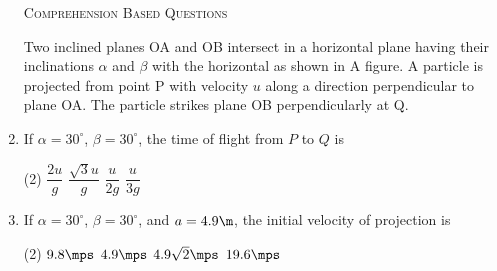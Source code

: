 \documentclass{article}
\renewcommand{\ans}{\quad}
\begin{document}
\begin{enumerate}
    \begin{center}
        \textsc{Comprehension Based Questions}
    \end{center}
    Two inclined planes OA and OB intersect in a horizontal plane having their inclinations $\alpha$ and $\beta$ with the horizontal as shown in A figure. A particle is projected from point P with velocity $u$ along a direction perpendicular to plane OA. The particle strikes plane OB perpendicularly at Q.
    \begin{center}
    \end{center}
    \item If $\alpha=30^\circ$, $\beta=30^\circ$, the time of flight from $P$ to $Q$ is
    \begin{tasks}(2)
        \task $\dfrac{2u}{g}$
        \task $\dfrac{\sqrt{3}u}{g}$\ans
        \task $\dfrac{u}{2g}$
        \task $\dfrac{u}{3g}$
    \end{tasks}

    \item If $\alpha=30^\circ$, $\beta=30^\circ$, and $a=4.9\m$, the initial velocity of projection is
    \begin{tasks}(2)
        \task $9.8\mps$\ans
        \task $4.9\mps$
        \task $4.9\sqrt{2}\mps$
        \task $19.6\mps$
    \end{tasks}
	
\end{enumerate}


\pagebreak


\end{document}
